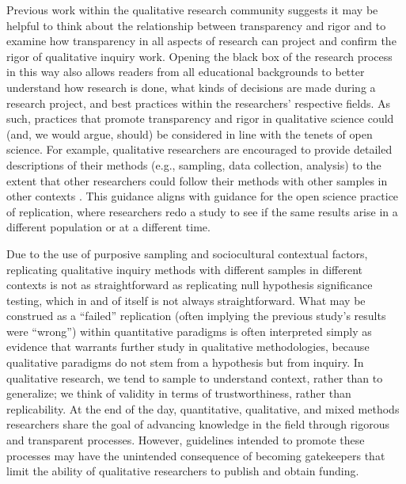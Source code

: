 \documentclass[authordate, meta]{jote-new-article}
\begin{document}
Previous work within the qualitative research community suggests it may be helpful to think about the relationship between transparency and rigor \parencites[e.g.,][]{Billups2014}{Davies2002}{Mill2003}{Rolfe2006} and to examine how transparency in all aspects of research can project and confirm the rigor of qualitative inquiry work. Opening the black box of the research process in this way also allows readers from all educational backgrounds to better understand how research is done, what kinds of decisions are made during a research project, and best practices within the researchers’ respective fields. As such, practices that promote transparency and rigor in qualitative science could (and, we would argue, should) be considered in line with the tenets of open science. For example, qualitative researchers are encouraged to provide detailed descriptions of their methods (e.g., sampling, data collection, analysis) to the extent that other researchers could follow their methods with other samples in other contexts \parencites{Creswell2018}. This guidance aligns with guidance for the open science practice of replication, where researchers redo a study to see if the same results arise in a different population or at a different time.



Due to the use of purposive sampling and sociocultural contextual factors, replicating qualitative inquiry methods with different samples in different contexts is not as straightforward as replicating null hypothesis significance testing, which in and of itself is not always straightforward. What may be construed as a “failed” replication (often implying the previous study’s results were “wrong”) within quantitative paradigms is often interpreted simply as evidence that warrants further study in qualitative methodologies, because qualitative paradigms do not stem from a hypothesis but from inquiry. In qualitative research, we tend to sample to understand context, rather than to generalize; we think of validity in terms of trustworthiness, rather than replicability. At the end of the day, quantitative, qualitative, and mixed methods researchers share the goal of advancing knowledge in the field through rigorous and transparent processes. However, guidelines intended to promote these processes may have the unintended consequence of becoming gatekeepers that limit the ability of qualitative researchers to publish and obtain funding.
\end{document}
